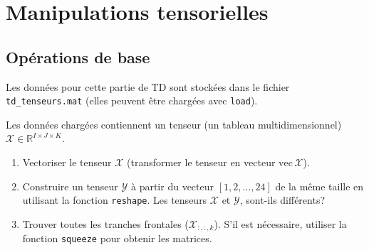 \chapter{Manipulations tensorielles}

\section{Opérations de base}
Les données pour cette partie de TD sont stockées dans le fichier \lstinline{td_tenseurs.mat} (elles peuvent être chargées avec \lstinline{load}).

Les données chargées contiennent un tenseur (un tableau multidimensionnel) $\mathcal{X} \in \mathbb{R}^{I \times J\times K}$.
\begin{enumerate}
\item Vectoriser le tenseur  $\mathcal{X}$ (transformer le tenseur en  vecteur $\textrm{vec}\, \mathcal{X}$).%
\item Construire un tenseur $\mathcal{Y}$ à partir du vecteur $[1,2, \ldots, 24]$ de la même taille en utilisant la fonction \texttt{reshape}.
Les tenseurs $\mathcal{X}$ et  $\mathcal{Y}$, sont-ils différents?

\item Trouver toutes les tranches frontales ($\mathcal{X}_{:,:,k}$). S'il est nécessaire, utiliser la fonction {\tt squeeze} pour obtenir les matrices.
\end{enumerate}

